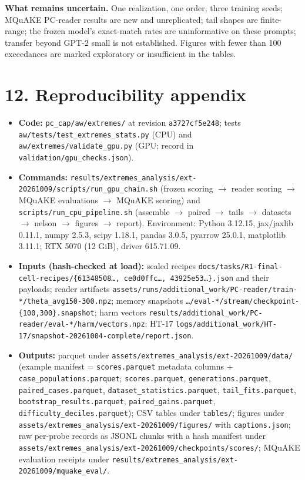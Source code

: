 \documentclass[10pt,a4paper]{article}
\begin{document}
\textbf{What remains uncertain.} One realization, one order, three training seeds; MQuAKE PC-reader results are new and unreplicated; tail shapes are finite-range; the frozen model's exact-match rates are uninformative on these prompts; transfer beyond GPT-2 small is not established. Figures with fewer than 100 exceedances are marked exploratory or insufficient in the tables.



\section*{12. Reproducibility appendix}



\begin{itemize}
\item \textbf{Code:} \texttt{pc\_cap/aw/extremes/} at revision \texttt{a3727cf5e248}; tests \texttt{aw/tests/test\_extremes\_stats.py} (CPU) and \texttt{aw/extremes/validate\_gpu.py} (GPU; record in \texttt{validation/gpu\_checks.json}).
\item \textbf{Commands:} \texttt{results/extremes\_analysis/ext-20261009/scripts/run\_gpu\_chain.sh} (frozen scoring $\to$ reader scoring $\to$ MQuAKE evaluations $\to$ MQuAKE scoring) and \texttt{scripts/run\_cpu\_pipeline.sh} (assemble $\to$ paired $\to$ tails $\to$ datasets $\to$ nelson $\to$ figures $\to$ report). Environment: Python 3.12.15, jax/jaxlib 0.11.1, numpy 2.5.3, scipy 1.18.1, pandas 3.0.5, pyarrow 25.0.1, matplotlib 3.11.1; RTX 5070 (12 GiB), driver 615.71.09.
\item \textbf{Inputs (hash-checked at load):} sealed recipes \texttt{docs/tasks/R1-final-cell-recipes/\{61348508\ldots{}, ce0d0ffc\ldots{}, 43925e53\ldots{}\}.json} and their payloads; reader artifacts \texttt{assets/runs/additional\_work/PC-reader/train-*/theta\_avg150-300.npz}; memory snapshots \texttt{\ldots{}/eval-*/stream/checkpoint-\{100,300\}.snapshot}; harm vectors \texttt{results/additional\_work/PC-reader/eval-*/harm/vectors.npz}; HT-17 \texttt{logs/additional\_work/HT-17/snapshot-20261004-complete/report.json}.
\item \textbf{Outputs:} parquet under \texttt{assets/extremes\_analysis/ext-20261009/data/} (example manifest = \texttt{scores.parquet} metadata columns + \texttt{case\_populations.parquet}; \texttt{scores.parquet}, \texttt{generations.parquet}, \texttt{paired\_cases.parquet}, \texttt{dataset\_statistics.parquet}, \texttt{tail\_fits.parquet}, \texttt{bootstrap\_results.parquet}, \texttt{paired\_gains.parquet}, \texttt{difficulty\_deciles.parquet}); CSV tables under \texttt{tables/}; figures under \texttt{assets/extremes\_analysis/ext-20261009/figures/} with \texttt{captions.json}; raw per-probe records as JSONL chunks with a hash manifest under \texttt{assets/extremes\_analysis/ext-20261009/checkpoints/scores/}; MQuAKE evaluation receipts under \texttt{results/extremes\_analysis/ext-20261009/mquake\_eval/}.

\end{itemize}
\end{document}
